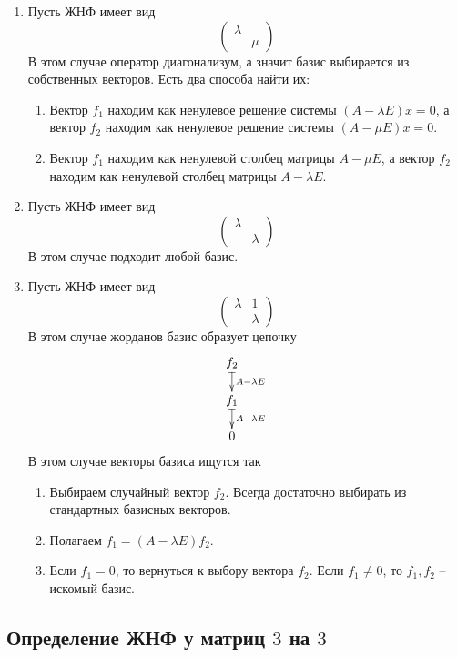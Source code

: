 \documentclass{article}
\begin{document}
\begin{enumerate}
\item Пусть ЖНФ имеет вид
\[
\begin{pmatrix}
{\lambda}&{}\\
{}&{\mu}
\end{pmatrix}
\]
В этом случае оператор диагонализум, а значит базис выбирается из собственных векторов. Есть два способа найти их:
\begin{enumerate}
\item Вектор $f_1$ находим как ненулевое решение системы $(A- \lambda E) x = 0$, а вектор $f_2$ находим как ненулевое решение системы $(A - \mu E) x = 0$.

\item Вектор $f_1$ находим как ненулевой столбец матрицы $A - \mu E$, а вектор $f_2$ находим как ненулевой столбец матрицы $A-\lambda E$.
\end{enumerate}

\item Пусть ЖНФ имеет вид
\[
\begin{pmatrix}
{\lambda}&{}\\
{}&{\lambda}
\end{pmatrix}
\]
В этом случае подходит любой базис.

\item Пусть ЖНФ имеет вид
\[
\begin{pmatrix}
{\lambda}&{1}\\
{}&{\lambda}
\end{pmatrix}
\]
В этом случае жорданов базис образует цепочку
\[
\xymatrix@R=15pt@C=15pt{
  {f_2}\ar@{|->}[d]^{A-\lambda E}\\
  {f_1}\ar@{|->}[d]^{A-\lambda E}\\
  {0}
}
\]
В этом случае векторы базиса ищутся так
\begin{enumerate}
\item Выбираем случайный вектор $f_2$. Всегда достаточно выбирать из стандартных базисных векторов.
\item Полагаем $f_1 = (A - \lambda E) f_2$.
\item Если $f_1 = 0$, то вернуться к выбору вектора $f_2$. Если $f_1 \neq 0$, то $f_1, f_2$ -- искомый базис.
\end{enumerate}
\end{enumerate}

\subsection{Определение ЖНФ у матриц $3$ на $3$}
\end{document}
